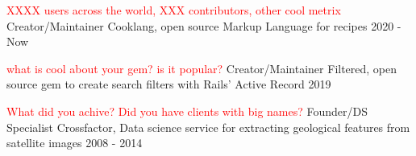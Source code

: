 
\begin{cventries}

  \cvblitz
    {\textcolor{red}{XXXX users across the world, XXX contributors, other cool metrix}} %
    {Creator/Maintainer}
    {Cooklang, open source Markup Language for recipes} %
    {} %
    {2020 - Now} %

  \cvblitz
    {\textcolor{red}{what is cool about your gem? is it popular?}} %
    {Creator/Maintainer}
    {Filtered, open source gem to create search filters with Rails’ Active Record} %
    {} %
    {2019} %

  \cvblitz
    {\textcolor{red}{What did you achive? Did you have clients with big names?}} %
    {Founder/DS Specialist}
    {Crossfactor, Data science service for extracting geological features from satellite images} %
    {} %
    {2008 - 2014} %


\end{cventries}